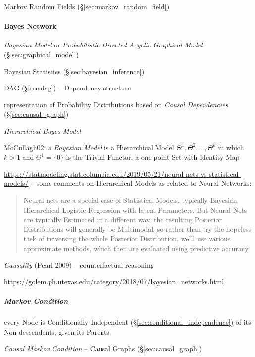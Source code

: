 Markov Random Fields (\S\ref{sec:markov_random_field})



\paragraph{Bayes Network}\label{sec:bayes_network}\hfill

\emph{Bayesian Model} or \emph{Probabilistic Directed Acyclic Graphical Model}
(\S\ref{sec:graphical_model})

Bayesian Statistics (\S\ref{sec:bayesian_inference})

DAG (\S\ref{sec:dag}) -- Dependency structure

representation of Probability Distributions based on \emph{Causal Dependencies}
(\S\ref{sec:causal_graph})

\emph{Hierarchical Bayes Model}

McCullagh02: a \emph{Bayesian Model} is a Hierarchical Model
$\Theta^1, \Theta^2, \ldots, \Theta^k$ in which $k > 1$ and $\Theta^1 = \{0\}$
is the Trivial Functor, a one-point Set with Identity Map

\url{https://statmodeling.stat.columbia.edu/2019/05/21/neural-nets-vs-statistical-models/}
-- some comments on Hierarchical Models as related to Neural Networks:
\begin{quote}
  Neural nets are a special case of Statistical Models, typically Bayesian
  Hierarchical Logistic Regression with latent Parameters. But Neural Nets are
  typically Estimated in a different way: the resulting Posterior Distributions
  will generally be Multimodal, so rather than try the hopeless task of
  traversing the whole Posterior Distribution, we’ll use various approximate
  methods, which then are evaluated using predictive accuracy.
\end{quote}

\emph{Causality} (Pearl 2009) -- counterfactual reasoning

\url{https://golem.ph.utexas.edu/category/2018/07/bayesian_networks.html}



\subparagraph{Markov Condition}\label{sec:markov_condition}\hfill

every Node is Conditionally Independent (\S\ref{sec:conditional_independence})
of its Non-descendents, given its Parents

\emph{Causal Markov Condition}
--
Causal Graphs (\S\ref{sec:causal_graph})



